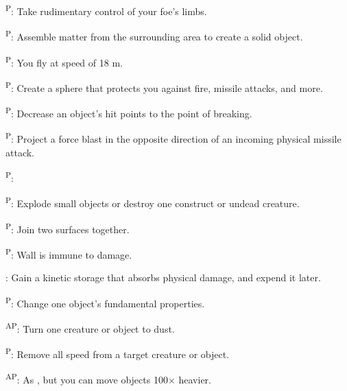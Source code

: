 \begin{enumerate*}
\item {}\textsuperscript{P}: Take rudimentary control of your foe's limbs.

      \textsuperscript{P}: Assemble matter from the surrounding area to create a solid object.

      \textsuperscript{P}: You fly at speed of 18 m.

      \textsuperscript{P}: Create a sphere that protects you against fire, missile attacks, and more.

      \textsuperscript{P}: Decrease an object's hit points to the point of breaking.

      \textsuperscript{P}: Project a force blast in the opposite direction of an incoming physical missile attack.

\item {}\textsuperscript{P}:

      \textsuperscript{P}: Explode small objects or destroy one construct or undead creature.

      \textsuperscript{P}: Join two surfaces together.

      \textsuperscript{P}: Wall is immune to damage.

\item {}: Gain a kinetic storage that absorbs physical damage, and expend it later.

      \textsuperscript{P}: Change one object's fundamental properties.

\item {}\textsuperscript{AP}: Turn one creature or object to dust.

\item {}\textsuperscript{P}: Remove all speed from a target creature or object.

\item {}\textsuperscript{AP}: As , but you can move objects 100$\times$ heavier.
\end{enumerate*}



